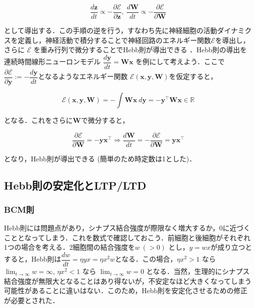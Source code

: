 \begin{equation}
\frac{d \mathbf{z}}{dt}\propto-\frac{\partial \mathcal{E}}{\partial \mathbf{z}},\ \frac{d \mathbf{W}}{dt}\propto-\frac{\partial \mathcal{E}}{\partial \mathbf{W}}
\end{equation}


として導出する．この手順の逆を行う，すなわち先に神経細胞の活動ダイナミクスを定義し，神経活動で積分することで神経回路のエネルギー関数$\mathcal{E}$を導出し，さらに $\mathcal{E}$ を重み行列で微分することでHebb則が導出できる \cite{Isomura2020-sn}．Hebb則の導出を連続時間線形ニューロンモデル $\dfrac{d\mathbf{y}}{dt}=\mathbf{W}\mathbf{x}$ を例にして考えよう．ここで$\dfrac{\partial\mathcal{E}}{\partial\mathbf{y}}:=-\dfrac{d\mathbf{y}}{dt}$となるようなエネルギー関数 $\mathcal{E}(\mathbf{x}, \mathbf{y}, \mathbf{W})$を仮定すると，


\begin{equation}
\mathcal{E}(\mathbf{x}, \mathbf{y}, \mathbf{W})=-\int \mathbf{W}\mathbf{x}\ d\mathbf{y}=-\mathbf{y}^\top \mathbf{W}\mathbf{x} \in \mathbb{R}
\end{equation}


となる．これをさらに$\mathbf{W}$で微分すると，


\begin{equation}
\dfrac{\partial\mathcal{E}}{\partial\mathbf{W}}=-\mathbf{y}\mathbf{x}^\top\Rightarrow
\frac{d\mathbf{W}}{dt}=-\dfrac{\partial\mathcal{E}}{\partial\mathbf{W}}=\mathbf{y}\mathbf{x}^\top
\end{equation}


となり，Hebb則が導出できる (簡単のため時定数は1とした)．
\subsection{Hebb則の安定化とLTP/LTD}
\subsubsection{BCM則}
Hebb則には問題点があり，シナプス結合強度が際限なく増大するか，0に近づくこととなってしまう．これを数式で確認しておこう．前細胞と後細胞がそれぞれ1つの場合を考える．2細胞間の結合強度を$w\ (>0)$ とし，$y=wx$が成り立つとすると，Hebb則は$\dfrac{dw}{dt}=\eta yx=\eta x^2w$となる．この場合，$\eta x^2>1$ なら $\lim_{t\to\infty} w= \infty$, $\eta x^2<1$ なら $\lim_{t\to\infty} w= 0$ となる．当然，生理的にシナプス結合強度が無限大となることはあり得ないが，不安定なほど大きくなってしまう可能性があることに違いはない．このため，Hebb則を安定化させるための修正が必要とされた．

